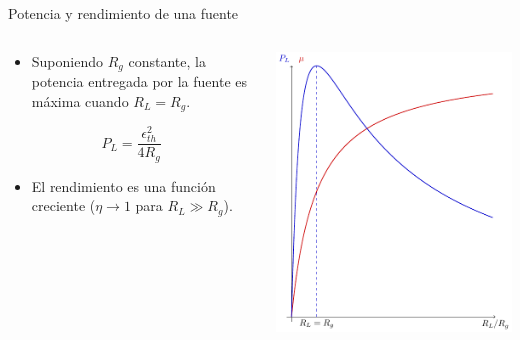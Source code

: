 \documentclass[aspectratio=169, usenames,svgnames,dvipsnames]{beamer}
\begin{document}
\begin{frame}[label={sec:org13a2beb}]{Potencia y rendimiento de una fuente}
\begin{columns}
\begin{column}{0.5\columnwidth}
\begin{itemize}
\item Suponiendo \(R_g\) constante, la potencia entregada por la fuente es máxima cuando \(R_L = R_g\).
\end{itemize}

\begin{equation*}
  P_L = \frac{\epsilon^2_{th}}{4 R_g}
\end{equation*}

\begin{itemize}
\item El rendimiento es una función creciente (\(\eta \to 1\) para \(R_L \gg R_g\)).
\end{itemize}
\end{column}

\begin{column}{0.5\columnwidth}
\begin{center}
\includegraphics[height=0.85\textheight]{../figs/FuenteReal_PotenciaRendimiento.pdf}
\end{center}
\end{column}
\end{columns}
\end{frame}
\end{document}
